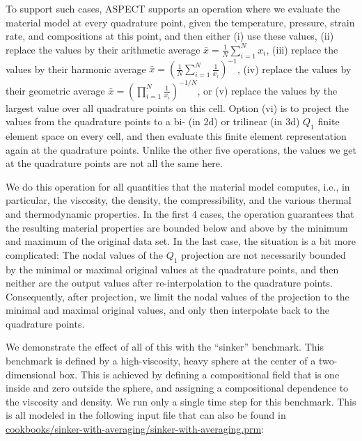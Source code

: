 \documentclass{article}
\newcommand{\aspect}{\textsc{ASPECT}}
\begin{document}
To support such cases, \aspect{} supports an operation where we evaluate the
material model at every quadrature point, given the temperature, pressure,
strain rate, and compositions at this point, and then either (i) use these
values, (ii) replace the values by their arithmetic average $\bar x = \frac 1N
\sum_{i=1}^N x_i$, (iii) replace the values by their harmonic average $\bar x
= \left(\frac 1N \sum_{i=1}^N \frac{1}{x_i}\right)^{-1}$, (iv) replace the
values by their geometric average $\bar x 
= \left(\prod_{i=1}^N \frac{1}{x_i}\right)^{-1/N}$, 
or (v) replace the
values by the largest value over all quadrature points on this cell. Option
(vi) is to project the values from the quadrature points to a bi- (in 2d) or
trilinear (in 3d) $Q_1$ finite element space on every cell, and then evaluate this
finite element representation again at the quadrature points. Unlike the other
five operations, the values we get at the quadrature points are not all the
same here.

We do this operation for all quantities that the material model computes,
i.e., in particular, the viscosity, the density, the compressibility, and the
various thermal and thermodynamic properties. In the first 4 cases, the
operation guarantees that the resulting material properties are bounded below
and above by the minimum and maximum of the original data set. In the last
case, the situation is a bit more complicated: The nodal values of the $Q_1$
projection are not necessarily bounded by the minimal or maximal original
values at the quadrature points, and then neither are the output values after
re-interpolation to the quadrature points. Consequently, after projection, we
limit the nodal values of the projection to the minimal and maximal original
values, and only then interpolate back to the quadrature points.

We demonstrate the effect of all of this with the ``sinker'' benchmark. This
benchmark is defined by a high-viscosity, heavy sphere at the center of a
two-dimensional box. This is achieved by defining a compositional field that is
one inside and zero outside the sphere, and assigning a compositional dependence
to the viscosity and density. We run only a single time step for this benchmark.
This is all modeled in the following input file that can also be found in
\url{cookbooks/sinker-with-averaging/sinker-with-averaging.prm}:

\end{document}
